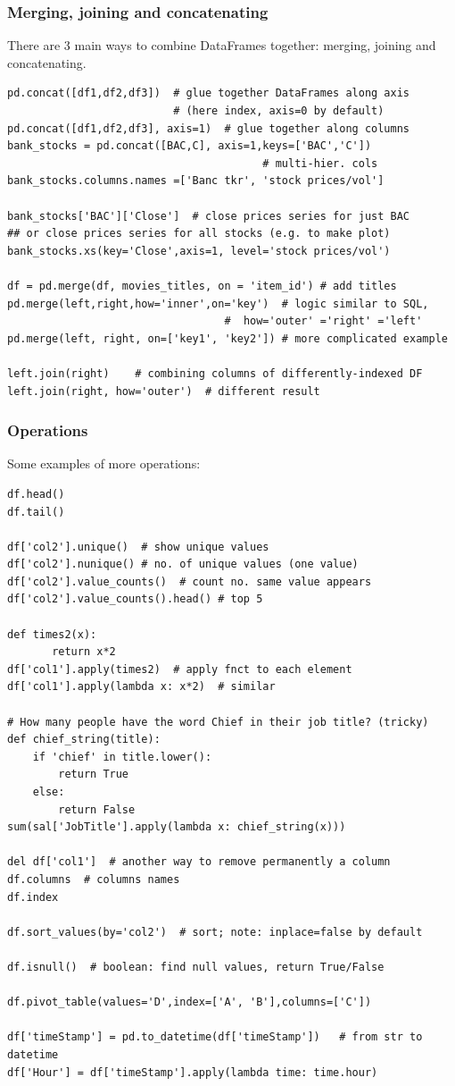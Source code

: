 \documentclass[12pt]{article}
\begin{document}
\subsubsection{Merging, joining and concatenating}
There are 3 main ways to combine DataFrames together: merging, joining and concatenating.
\begin{lstlisting}
pd.concat([df1,df2,df3])  # glue together DataFrames along axis 
                          # (here index, axis=0 by default)
pd.concat([df1,df2,df3], axis=1)  # glue together along columns
bank_stocks = pd.concat([BAC,C], axis=1,keys=['BAC','C']) 
									    # multi-hier. cols
bank_stocks.columns.names =['Banc tkr', 'stock prices/vol']

bank_stocks['BAC']['Close']  # close prices series for just BAC
## or close prices series for all stocks (e.g. to make plot)
bank_stocks.xs(key='Close',axis=1, level='stock prices/vol') 

df = pd.merge(df, movies_titles, on = 'item_id') # add titles
pd.merge(left,right,how='inner',on='key')  # logic similar to SQL, 
                                  #  how='outer' ='right' ='left'
pd.merge(left, right, on=['key1', 'key2']) # more complicated example

left.join(right)    # combining columns of differently-indexed DF
left.join(right, how='outer')  # different result
\end{lstlisting}

\subsubsection{Operations}
Some examples of more operations:
\begin{lstlisting}
df.head()
df.tail()

df['col2'].unique()  # show unique values
df['col2'].nunique() # no. of unique values (one value)
df['col2'].value_counts()  # count no. same value appears
df['col2'].value_counts().head() # top 5

def times2(x): 
       return x*2
df['col1'].apply(times2)  # apply fnct to each element
df['col1'].apply(lambda x: x*2)  # similar

# How many people have the word Chief in their job title? (tricky)
def chief_string(title):
	if 'chief' in title.lower():
		return True
	else:
		return False
sum(sal['JobTitle'].apply(lambda x: chief_string(x)))

del df['col1']  # another way to remove permanently a column
df.columns  # columns names
df.index 

df.sort_values(by='col2')  # sort; note: inplace=false by default

df.isnull()  # boolean: find null values, return True/False

df.pivot_table(values='D',index=['A', 'B'],columns=['C'])

df['timeStamp'] = pd.to_datetime(df['timeStamp'])   # from str to datetime
df['Hour'] = df['timeStamp'].apply(lambda time: time.hour)
\end{lstlisting}
\end{document}
